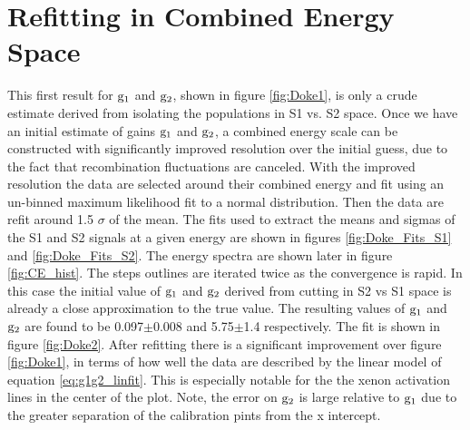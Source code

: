 \section{Refitting in Combined Energy Space}
\label{sec:Doke2}
This first result for $\rm g_1$ and $\rm g_2$, shown in figure \ref{fig:Doke1}, is only a crude estimate derived from isolating the populations in S1 vs. S2 space. Once we have an initial estimate of gains $\rm g_1$ and $\rm g_2$, a combined energy scale can be constructed with significantly improved resolution over the initial guess, due to the fact that recombination fluctuations are canceled. With the improved resolution the data are selected around their combined energy and fit using an un-binned maximum likelihood fit to a normal distribution. Then the data are refit around 1.5 $\sigma$ of the mean. The fits used to extract the means and sigmas  of the S1 and S2 signals at a given energy are shown in figures \ref{fig:Doke_Fits_S1} and \ref{fig:Doke_Fits_S2}. The energy spectra are shown later in figure \ref{fig:CE_hist}. The steps outlines are iterated twice as the convergence is rapid. In this case the initial value of $\rm g_1$ and $\rm g_2$ derived from cutting in S2 vs S1 space is already a close approximation to the true value. The resulting values of $\rm g_1$ and $\rm g_2$ are found to be 0.097$\pm$0.008 and 5.75$\pm$1.4 respectively. The fit is shown in figure \ref{fig:Doke2}. After refitting there is a significant improvement over figure \ref{fig:Doke1}, in terms of how well the data are described by the linear model of equation \ref {eq:g1g2_linfit}. This is especially notable for the the xenon activation lines in the center of the plot.  Note, the error on $\rm g_2$ is large relative to $\rm g_1$ due to the greater separation of the calibration pints from the x intercept. 


